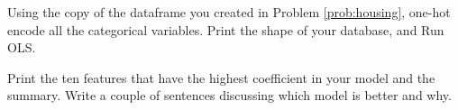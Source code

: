 \begin{problem}

Using the copy of the dataframe you created in Problem \ref{prob:housing}, one-hot encode all the categorical variables.
Print the shape of your database, and Run OLS.

Print the ten features that have the highest coefficient in your model and the summary.
Write a couple of sentences discussing which model is better and why.

\end{problem}

\begin{comment}
\url{https://docs.google.com/spreadsheets/d/1oJBaH2x369leRtL19HD8n1oZlGqwK9Yz9b14ppUEhXg/edit#gid=439114268} birth quarter affects percentiles
\end{comment}
